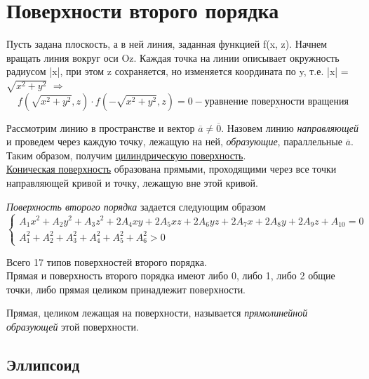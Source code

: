 \section{Поверхности второго порядка}

Пусть задана плоскость, а в ней линия, заданная функцией f(x, z). Начнем вращать линия вокруг оси Oz. Каждая точка на линии описывает окружность радиусом |x|, при этом z сохраняется, но изменяется координата по y, т.е. |x| = $\sqrt{x^2 + y^2}$ $\Longrightarrow$
\[
f(\sqrt{x^2 + y^2}, z)\cdot f(-\sqrt{x^2 + y^2}, z) = 0 - \underline{\text{уравнение поверхности вращения}}
\]

Рассмотрим линию в пространстве и вектор $\overline{a}\neq\overline{0}$. Назовем линию \textit{направляющей} и проведем через каждую точку, лежащую на ней, \textit{образующие}, параллельные $\overline{a}$. Таким образом, получим \underline{цилиндрическую поверхность}.\\

\underline{Коническая поверхность} образована прямыми, проходящими через все точки направляющей кривой и точку, лежащую вне этой кривой.\\

\begin{definition}
    \textit{Поверхность второго порядка} задается следующим образом
    \[
    \begin{cases}
        A_1x^2 + A_2y^2 + A_3z^2 + 2A_4xy + 2A_5xz + 2A_6yz + 2A_7x + 2A_8y + 2A_9z + A_{10} = 0\\
        A_1^2 + A_2^2 + A_3^2 + A_4^2 + A_5^2 + A_6^2 > 0
    \end{cases}
    \]
\end{definition}

Всего 17 типов поверхностей второго порядка.\\

Прямая и поверхность второго порядка имеют либо 0, либо 1, либо 2 общие точки, либо прямая целиком принадлежит поверхности.\\

\begin{definition}
    Прямая, целиком лежащая на поверхности, называется \textit{прямолинейной образующей} этой поверхности.
\end{definition}

\subsection{Эллипсоид}

